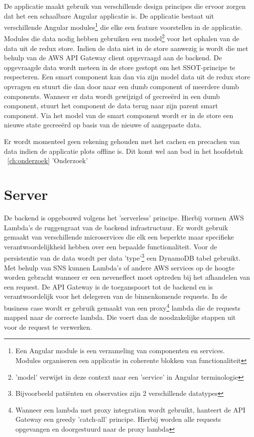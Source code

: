 De applicatie maakt gebruik van verschillende design principes\autocite{brechtbilliet-scalable}\autocite{minko-gechev-scalable} die ervoor zorgen dat het een schaalbare Angular applicatie is. De applicatie bestaat uit verschillende Angular modules\footnote{Een Angular module is een verzameling van componenten en services. Modules organiseren een applicatie in coherente blokken van functionaliteit} die elke een feature voorstellen in de applicatie. 
\clearpage
Modules die data nodig hebben gebruiken een model\footnote{'model' verwijst in deze context naar een 'service' in Angular terminologie} voor het ophalen van de data uit de redux store. Indien de data niet in de store aanwezig is wordt die met behulp van de AWS API Gateway client opgevraagd aan de backend. De opgevraagde data wordt meteen in de store gestopt om het SSOT-principe te respecteren. Een smart component kan dan via zijn model data uit de redux store opvragen en stuurt die dan door naar een dumb component of meerdere dumb components. Wanneer er data wordt gewijzigd of gecree\"erd in een dumb component, stuurt het component de data terug naar zijn parent smart component. Via het model van de smart component wordt er in de store een nieuwe state gecree\"erd op basis van de nieuwe of aangepaste data.

Er wordt momenteel geen rekening gehouden met het cachen en precachen van data indien de applicatie plots offline is. Dit komt wel aan bod in het hoofdstuk ~\ref{ch:onderzoek} 'Onderzoek'
\section{Server}
De backend is opgebouwd volgens het 'serverless'\autocite{scalable-theorie} principe. Hierbij vormen AWS Lambda's de ruggengraat van de backend infrastructuur. Er wordt gebruik gemaakt van verschillende microservices die elk een beperkte maar specifieke verantwoordelijkheid hebben over een bepaalde functionaliteit. Voor de persistentie van de data wordt per data 'type'\footnote{Bijvoorbeeld pati\"enten en observaties zijn 2 verschillende datatypes} een DynamoDB tabel gebruikt. Met behulp van SNS kunnen Lambda's of andere AWS services op de hoogte worden gebracht wanneer er een neveneffect moet optreden bij het afhandelen van een request. De API Gateway is de toeganspoort tot de backend en is verantwoordelijk voor het delegeren van de binnenkomende requests. In de business case wordt er gebruik gemaakt van een proxy\footnote{Wanneer een lambda met proxy integration wordt gebruikt, hanteert de API Gateway een greedy 'catch-all' principe. Hierbij worden alle requests opgevangen en doorgestuurd naar de proxy lambda} lambda die de requests mapped naar de correcte lambda. Die voert dan de noodzakelijke stappen uit voor de request te verwerken.

